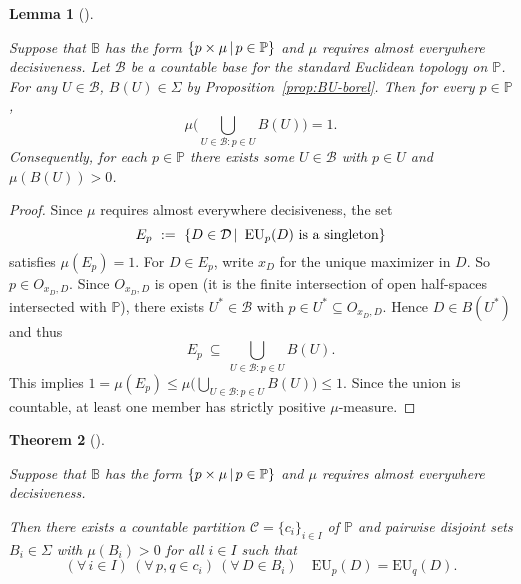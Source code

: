 \documentclass[a4paper]{article}
\newtheorem{theorem}{Theorem}
\newtheorem{lemma}[theorem]{Lemma}
\renewcommand\P{\mathbb{P}} %
\newcommand\EU{\mathrm{EU}}
\newcommand{\Decs}{\mathcal{D}}
\newcommand{\IB}{\mathbb{B}}
\newcommand{\IP}{\P}
\newcommand\SetDelimiter[1][]{
	\nonscript\,#1\vert \allowbreak \nonscript\,\mathopen{}}
\providecommand\given{\SetDelimiter}
\newenvironment{CCM rewritten}
{\begingroup\color{blue}} %
{\endgroup}              %
\begin{document}
\begin{lemma}[]\label{lem:pos-meas-agree}

Suppose that $\IB$ has the form $\{p\times \mu\given p\in \IP\}$ and $\mu$ requires almost everywhere decisiveness. Let $\mathcal{B}$ be a countable base for the standard Euclidean topology on $\IP$. For any $U\in\mathcal{B}$, $B(U)\in\Sigma$ by Proposition~\ref{prop:BU-borel}. Then for every $p\in \IP$,
\[
\mu\Big(\bigcup_{U\in\mathcal{B}:p\in U} B(U)\Big)=1.
\]
Consequently, for each $p\in \IP$ there exists some $U\in\mathcal{B}$ with $p\in U$ and $\mu(B(U))>0$.
\end{lemma}

\begin{proof}
Since $\mu$ requires almost everywhere decisiveness, the set
\[
E_p\ :=\ \{D\in \Decs\given\ \EU_p(D)\ \text{is a singleton}\}
\]
satisfies $\mu(E_p)=1$. For $D\in E_p$, write $x_D$ for the unique maximizer in $D$. So $p\in O_{x_D,D}$. Since $O_{x_D,D}$ is open (it is the finite intersection of open half-spaces intersected with $\IP$), there exists $U^*\in\mathcal{B}$ with $p\in U^*\subseteq O_{x_D,D}$. Hence $D\in B(U^*)$ and thus
\[
E_p\ \subseteq\ \bigcup_{U\in\mathcal{B}:p\in U} B(U).
\]
This implies $1=\mu(E_p)\le \mu\big(\bigcup_{U\in\mathcal{B}:p\in U} B(U)\big)\le 1$. Since the union is countable, at least one member has strictly positive $\mu$-measure.
\end{proof}





\begin{theorem}[]\label{thm:part-cond}

Suppose that $\IB$ has the form $\{p\times \mu\given p\in \IP\}$ and $\mu$ requires almost everywhere decisiveness.


Then there exists a countable partition $\mathcal{C}=\{c_i\}_{i\in I}$ of $\IP$ and pairwise disjoint sets $B_i\in\Sigma$ with $\mu(B_i)>0$ for all $i\in I$ such that
\[
(\forall\, i\in I)\ (\forall\, p,q\in c_i)\ (\forall\, D\in B_i)\quad \EU_p(D)=\EU_q(D).
\]
\end{theorem}
\end{document}
